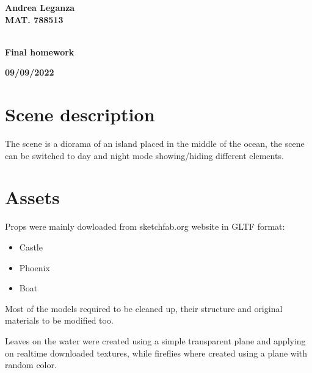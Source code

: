 \documentclass[10pt,a4paper]{article}
\begin{document}
\begin{titlepage}
\vspace{15mm}
\begin{center}
{\LARGE{\bf Andrea Leganza}}\\
\vspace{3mm}
{\LARGE{\bf MAT. 788513}}\\
\vspace{3mm}
{\LARGE{\bf\ }}\\
\end{center}
\vspace{40mm}
\par
\noindent
\begin{minipage}[t]{0.47\textwidth}
{\large{\bf}}
\end{minipage}
\hfill
\begin{center}
{\large{\bf Final homework }}
\end{center}
\vspace{20mm}
\begin{center}
{\large{\bf 09/09/2022}}
\end{center}
\end{titlepage}
\pagebreak


\section{Scene description}
The scene is a diorama of an island placed in the middle of the ocean, the scene can be switched to day and night mode showing/hiding different elements.

\section{Assets}

Props were mainly dowloaded from sketchfab.org website in GLTF format:

\begin{itemize}
 \item Castle
 \item Phoenix
 \item Boat
\end{itemize}

Most of the models required to be cleaned up, their structure and original materials to be modified too.

Leaves on the water were created using a simple transparent plane and applying on realtime downloaded textures, while fireflies where created using a plane with random color.
\end{document}
